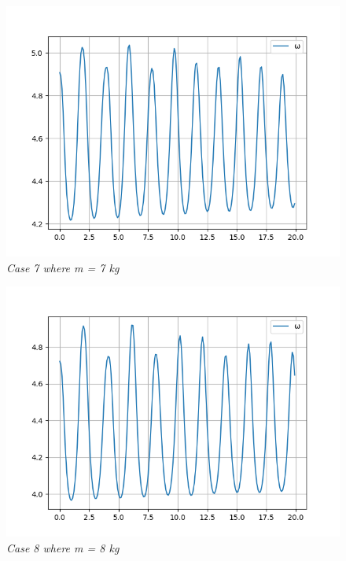         \begin{figure}[H]
            \centering
            \includegraphics{Appendix/RExpPictures/AF/afm7.png}
            \caption{\textit{Case 7 where m = 7 kg}}
            \label{}
        \end{figure}
            
        \begin{figure}[H]
            \centering
            \includegraphics{Appendix/RExpPictures/AF/afm8.png}
            \caption{\textit{Case 8 where m = 8 kg}}
            \label{}
        \end{figure}
            
